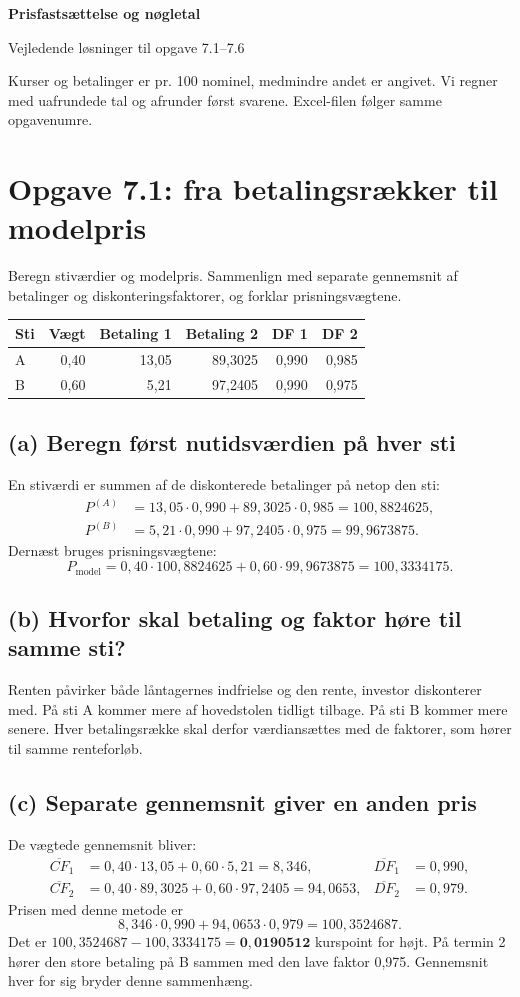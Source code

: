 \documentclass[11pt,a4paper]{article}
\newcommand{\opgave}[1]{\section*{#1}}
\newcommand{\del}[1]{\subsection*{#1}}
\begin{document}
{\Large\bfseries\color{navy} Prisfastsættelse og nøgletal}\par
Vejledende løsninger til opgave 7.1--7.6

Kurser og betalinger er pr. 100 nominel, medmindre andet er angivet. Vi regner med uafrundede tal og afrunder først svarene. Excel-filen følger samme opgavenumre.

\opgave{Opgave 7.1: fra betalingsrækker til modelpris}
\begin{tcolorbox}[title=Opgavebeskrivelse]
Beregn stiværdier og modelpris. Sammenlign med separate gennemsnit af betalinger og diskonteringsfaktorer, og forklar prisningsvægtene.
\begin{center}\begin{tabular}{lrrrrr}\toprule
Sti & Vægt & Betaling 1 & Betaling 2 & DF 1 & DF 2\\\midrule
A & 0,40 & 13,05 & 89,3025 & 0,990 & 0,985\\
B & 0,60 & 5,21 & 97,2405 & 0,990 & 0,975\\\bottomrule
\end{tabular}\end{center}
\end{tcolorbox}
\del{(a) Beregn først nutidsværdien på hver sti}
En stiværdi er summen af de diskonterede betalinger på netop den sti:
\[
\begin{aligned}
P^{(A)}&=13{,}05\cdot0{,}990+89{,}3025\cdot0{,}985=100{,}8824625,\\
P^{(B)}&=5{,}21\cdot0{,}990+97{,}2405\cdot0{,}975=99{,}9673875.
\end{aligned}
\]
Dernæst bruges prisningsvægtene:
\[
P_{\mathrm{model}}=0{,}40\cdot100{,}8824625+0{,}60\cdot99{,}9673875
=\boxed{100{,}3334175}.
\]
\del{(b) Hvorfor skal betaling og faktor høre til samme sti?}
Renten påvirker både låntagernes indfrielse og den rente, investor diskonterer med. På sti A kommer mere af hovedstolen tidligt tilbage. På sti B kommer mere senere. Hver betalingsrække skal derfor værdiansættes med de faktorer, som hører til samme renteforløb.

\del{(c) Separate gennemsnit giver en anden pris}
De vægtede gennemsnit bliver:
\[
\begin{aligned}
\overline{CF}_1&=0{,}40\cdot13{,}05+0{,}60\cdot5{,}21=8{,}346, &\overline{DF}_1&=0{,}990,\\
\overline{CF}_2&=0{,}40\cdot89{,}3025+0{,}60\cdot97{,}2405=94{,}0653,
&\overline{DF}_2&=0{,}979.
\end{aligned}
\]
Prisen med denne metode er
\[
8{,}346\cdot0{,}990+94{,}0653\cdot0{,}979=100{,}3524687.
\]
Det er $100{,}3524687-100{,}3334175=\mathbf{0{,}0190512}$ kurspoint for højt. På termin 2 hører den store betaling på B sammen med den lave faktor 0,975. Gennemsnit hver for sig bryder denne sammenhæng.
\end{document}
